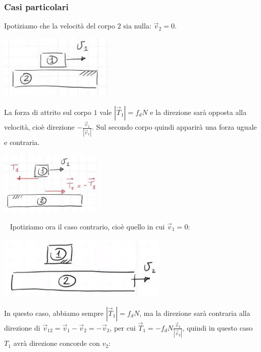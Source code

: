 \subsubsection{Casi particolari}
Ipotiziamo che la velocità del corpo $2$ sia nulla: $\vec{v}_2 = 0$.
\begin{center}
    \includegraphics[height=3cm]{../lezione11/img3.JPG}
\end{center}
La forza di attrito sul corpo $1$ vale $|\vec{T}_1| = f_d N$ e la direzione sarà opposta alla velocità, cioè direzione $- \frac{\vec{v}_1}{|\vec{v}_1|}$. Sul secondo corpo quindi apparirà una forza uguale e contraria.
\begin{center}
    \includegraphics[height=3cm]{../lezione11/img4.JPG}
\end{center}
\ \newline
Ipotiziamo ora il caso contrario, cioè quello in cui $\vec{v}_1 = 0$:
\begin{center}
    \includegraphics[height=3cm]{../lezione11/img5.JPG}
\end{center}
In questo caso, abbiamo sempre $|\vec{T}_1| = f_d N$, ma la direzione sarà contraria alla direzione di $\vec{v}_{12} = \vec{v}_1 - \vec{v}_2 = - \vec{v}_2$, per cui $\vec{T}_1 = - f_d N \frac{\vec{v}_2}{|\vec{v}_2|}$, quindi in questo caso $T_1$ avrà direzione concorde con $v_2$:\newline
